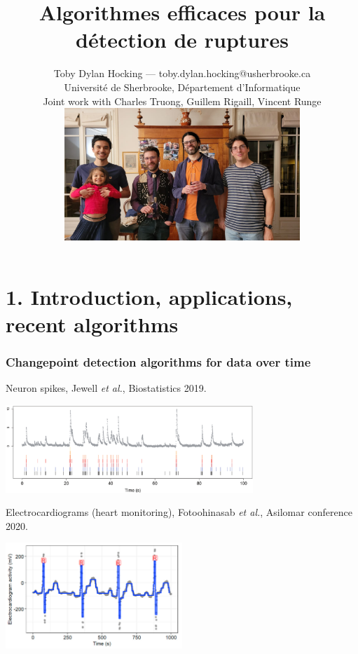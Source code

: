 \documentclass{beamer}
\begin{document}
\title{Algorithmes efficaces pour la détection de ruptures}

\author{
  Toby Dylan Hocking --- toby.dylan.hocking@usherbrooke.ca\\ 
  Université de Sherbrooke, Département d'Informatique\\
  Joint work with Charles Truong, Guillem Rigaill, Vincent Runge\\
  \includegraphics[height=5cm]{2025-01-photo-charles-toby-guillem-vincent.jpg}
}

\date{}

\maketitle

\section{1. Introduction, applications, recent algorithms} 
\begin{frame}
  \frametitle{Changepoint detection algorithms for data over time}
  Neuron spikes, Jewell \emph{et al.}, Biostatistics 2019.

  \includegraphics[width=0.7\textwidth]{intro-neuroscience} 

  Electrocardiograms (heart monitoring), 
  Fotoohinasab \emph{et al.}, 
  Asilomar conference 2020.

  \includegraphics[width=0.5\textwidth]{intro-ecg} 

\end{frame}
\end{document}
